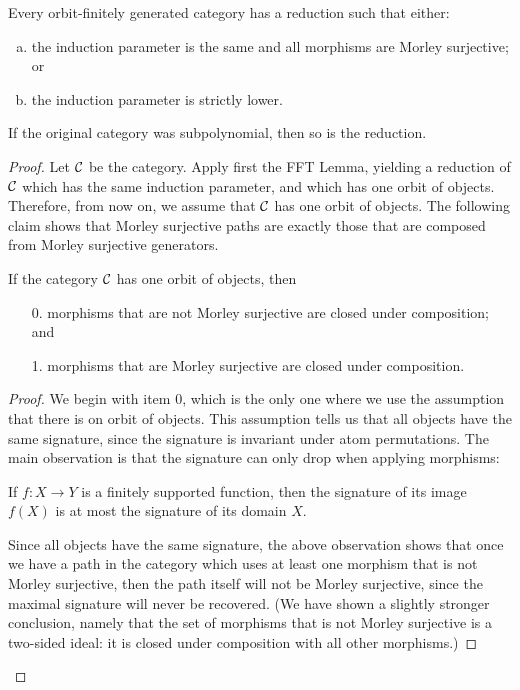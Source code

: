 \begin{lemma}
\label{lem:almost-surjective-reduction}
    Every orbit-finitely generated category  has a reduction such that either:
    \begin{enumerate}[(a)]
        \item \label{item:almost-surjective-reduction-ind} the  induction parameter is the same and all morphisms  are Morley surjective; or
        \item \label{item:almost-surjective-reduction-strict} the induction parameter is strictly lower.
    \end{enumerate}
    If the original category was subpolynomial, then so is the reduction.
\end{lemma}
\begin{proof}
    Let ${\mathcal C}$ be the category.
    Apply first the FFT Lemma, yielding a reduction of ${\mathcal C}$ which has the same induction parameter, and which has one orbit of objects. Therefore, from now on, we assume that ${\mathcal C}$ has one orbit of objects. The following claim shows that Morley surjective paths are exactly those that are composed from Morley surjective generators.
    \begin{claim}\label{claim:almost-surjective-composition}
        If the  category ${\mathcal C}$ has one orbit of objects, then 
        \begin{enumerate}
            \item[0.] morphisms that are not Morley surjective are closed under composition; and
            \item[1.] morphisms that are  Morley surjective are closed under composition.
        \end{enumerate}
    \end{claim}
    \begin{proof}
        We begin with item 0, which is the only one where we use the assumption that there is on orbit of objects.           This assumption tells us that all objects have the same signature, since the signature is invariant under atom permutations. The main observation is that the signature can only drop when applying morphisms:
                \begin{subclaim}\label{subclaim:signature-drop}
            If $f : X \to Y$ is a finitely supported function, then the signature of its image $f(X)$ is at most the signature of its domain $X$.
        \end{subclaim}
Since all objects have the same signature, the above observation shows that once we have a path in the category which uses at least one morphism that is not Morley surjective, then the path itself will not be Morley surjective, since the maximal signature will never be recovered. (We have shown a slightly stronger conclusion, namely that the set of morphisms that is not Morley surjective is a two-sided ideal: it is closed under composition with all other morphisms.)


\end{proof}
\end{proof}
